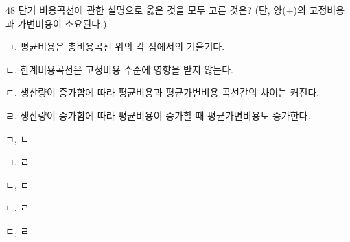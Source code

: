 \begin{question}{48}
단기 비용곡선에 관한 설명으로 옳은 것을 모두 고른 것은? (단, 양(+)의 고정비용과 가변비용이 소요된다.)
\begin{framedtext}
ㄱ. 평균비용은 총비용곡선 위의 각 점에서의 기울기다. \par
ㄴ. 한계비용곡선은 고정비용 수준에 영향을 받지 않는다. \par
ㄷ. 생산량이 증가함에 따라 평균비용과 평균가변비용 곡선간의 차이는 커진다. \par
ㄹ. 생산량이 증가함에 따라 평균비용이 증가할 때 평균가변비용도 증가한다.
\end{framedtext}
\begin{choices}
  \item ㄱ, ㄴ
  \item ㄱ, ㄹ
  \item ㄴ, ㄷ
  \item ㄴ, ㄹ
  \item ㄷ, ㄹ
\end{choices}
\end{question}
